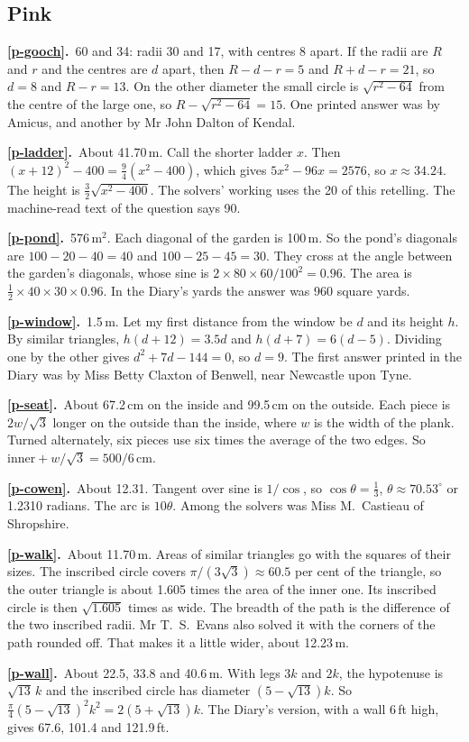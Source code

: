 \documentclass[11pt,a4paper]{article}
\newcommand{\ans}[2]{\par\smallskip\noindent\textbf{\ref{#1}.}\ #2}
\begin{document}
\subsection*{\color{bandpink}Pink}
\ans{p-gooch}{60 and 34: radii 30 and 17, with centres 8 apart. If the radii are $R$ and
$r$ and the centres are $d$ apart, then $R - d - r = 5$ and $R + d - r = 21$, so $d = 8$
and $R - r = 13$. On the other diameter the small circle is $\sqrt{r^2 - 64}$ from the
centre of the large one, so $R - \sqrt{r^2 - 64} = 15$. One printed answer was by
Amicus, and another by Mr John Dalton of Kendal.}
\ans{p-ladder}{About 41.70\,m. Call the shorter ladder $x$. Then
$(x + 12)^2 - 400 = \tfrac94(x^2 - 400)$, which gives $5x^2 - 96x = 2576$, so
$x \approx 34.24$. The height is $\tfrac32\sqrt{x^2 - 400}$. The solvers' working uses
the 20 of this retelling. The machine-read text of the question says 90.}
\ans{p-pond}{576\,m$^2$. Each diagonal of the garden is 100\,m. So the pond's diagonals
are $100 - 20 - 40 = 40$ and $100 - 25 - 45 = 30$. They cross at the angle between the
garden's diagonals, whose sine is $2\times80\times60/100^2 = 0.96$. The area is
$\tfrac12\times40\times30\times0.96$. In the Diary's yards the answer was 960 square
yards.}
\ans{p-window}{1.5\,m. Let my first distance from the window be $d$ and its height $h$.
By similar triangles, $h(d + 12) = 3.5d$ and $h(d + 7) = 6(d - 5)$. Dividing one by the
other gives $d^2 + 7d - 144 = 0$, so $d = 9$. The first answer printed in the Diary
was by Miss Betty Claxton of Benwell, near Newcastle upon Tyne.}
\ans{p-seat}{About 67.2\,cm on the inside and 99.5\,cm on the outside. Each piece is
$2w/\sqrt3$ longer on the outside than the inside, where $w$ is the width of the plank.
Turned alternately, six pieces use six times the average of the two edges. So
$\text{inner} + w/\sqrt3 = 500/6$\,cm.}
\ans{p-cowen}{About 12.31. Tangent over sine is $1/\cos$, so $\cos\theta = \tfrac13$,
$\theta \approx 70.53^\circ$ or 1.2310 radians. The arc is $10\theta$. Among the
solvers was Miss M.~Castieau of Shropshire.}
\ans{p-walk}{About 11.70\,m. Areas of similar triangles go with the squares of their
sizes. The inscribed circle covers $\pi/(3\sqrt3) \approx 60.5$ per cent of the triangle,
so the outer triangle is about 1.605 times the area of the inner one. Its inscribed
circle is then $\sqrt{1.605}$ times as wide. The breadth of the path is the difference
of the two inscribed radii. Mr T.~S.~Evans also solved it with the corners of the path
rounded off. That makes it a little wider, about 12.23\,m.}
\ans{p-wall}{About 22.5, 33.8 and 40.6\,m. With legs $3k$ and $2k$, the hypotenuse is
$\sqrt{13}\,k$ and the inscribed circle has diameter $(5 - \sqrt{13})k$. So
$\tfrac\pi4(5 - \sqrt{13})^2k^2 = 2(5 + \sqrt{13})k$. The Diary's version, with a wall
6\,ft high, gives 67.6, 101.4 and 121.9\,ft.}
\end{document}
